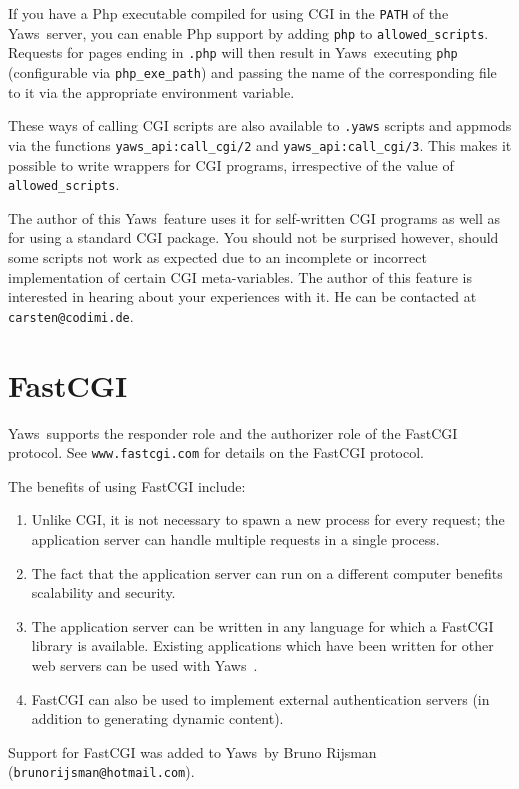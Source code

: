 \documentclass[11pt,oneside,english]{book}
\newcommand{\Yaws}            %
        {{\sc Yaws}}
\begin{document}
If you have a Php executable compiled for using CGI in the \verb+PATH+
of the \Yaws\  server, you can enable Php support by adding \verb+php+ to
\verb+allowed_scripts+.  Requests for pages ending in \verb+.php+ will
then result in \Yaws\  executing \verb+php+ (configurable via
\verb+php_exe_path+) and passing the name of the corresponding file to
it via the appropriate environment variable.

These ways of calling CGI scripts are also available to \verb+.yaws+
scripts and appmods via the functions \verb+yaws_api:call_cgi/2+ and
\verb+yaws_api:call_cgi/3+.  This makes it possible to write wrappers
for CGI programs, irrespective of the value of \verb+allowed_scripts+.

The author of this \Yaws\  feature uses it for self-written CGI programs
as well as for using a standard CGI package.  You should not be
surprised however, should some scripts not work as expected due to an
incomplete or incorrect implementation of certain CGI meta-variables.
The author of this feature is interested in hearing about your
experiences with it.  He can be contacted at \verb+carsten@codimi.de+.

\chapter{FastCGI}

\Yaws\  supports the responder role and the authorizer role of the
FastCGI protocol. See \verb+www.fastcgi.com+ for details on the
FastCGI protocol.

The benefits of using FastCGI include:
\begin{enumerate}
\item Unlike CGI, it is not necessary to spawn a new process for
every request; the application server can handle multiple requests
in a single process.
\item The fact that the application server can run on a different
computer benefits scalability and security.
\item The application server can be written in any language for
which a FastCGI library is available. Existing applications
which have been written for other web servers can be used with
\Yaws\ .
\item FastCGI can also be used to implement external authentication
servers (in addition to generating dynamic content).
\end{enumerate}

Support for FastCGI was added to \Yaws\  by Bruno Rijsman
(\verb+brunorijsman@hotmail.com+).
\end{document}

